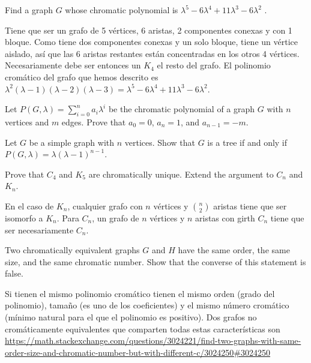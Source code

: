 \documentclass[twoside]{article}
\begin{document}
\begin{ejercicio}{3.8}
Find a graph $G$ whose chromatic polynomial is $λ^5 − 6λ^4 + 11λ^3 − 6λ^2$
.
\end{ejercicio}
\begin{solucion}
Tiene que ser un grafo de 5 vértices, 6 aristas, 2 componentes conexas y con 1 bloque. Como tiene dos componentes conexas y un solo bloque, tiene un vértice aislado, así que las 6 aristas restantes están concentradas en los otros 4 vértices. Necesariamente debe ser entonces un $K_4$ el resto del grafo. El polinomio cromático del grafo que hemos descrito es $\lambda^2(\lambda-1)(\lambda-2)(\lambda-3)=λ^5 − 6λ^4 + 11λ^3 − 6λ^2$.



\end{solucion}
\newpage

\begin{ejercicio}{3.9}
Let $P(G, λ) = \sum^n_{i=0} a_iλ^i$ be the chromatic polynomial of a graph $G$ with $n$ vertices and
$m$ edges. Prove that $a_0 = 0$, $a_n = 1$, and $a_{n−1} = −m$.
\end{ejercicio}
\begin{solucion}

\end{solucion}

\newpage

\begin{ejercicio}{3.10}
Let $G$ be a simple graph with $n$ vertices. Show that $G$ is a tree if and only if $P(G, λ) =
λ(λ − 1)^{n−1}$.

\end{ejercicio}
\begin{solucion}
\end{solucion}

\newpage

\begin{ejercicio}{3.11}
 Prove that $C_4$ and $K_5$ are chromatically unique. Extend the argument to $C_n$ and $K_n$.
\end{ejercicio}
\begin{solucion}
En el caso de $K_n$, cualquier grafo con $n$ vértices y $\binom{n}{2}$ aristas tiene que ser isomorfo a $K_n$. Para $C_n$, un grafo de $n$ vértices y $n$ aristas con girth $C_n$ tiene que ser necesariamente $C_n$. 
\end{solucion}

\newpage

\begin{ejercicio}{3.12}
Two chromatically equivalent graphs $G$ and $H$ have the same order, the same size, and
the same chromatic number. Show that the converse of this statement is false.
\end{ejercicio}
\begin{solucion}
Si tienen el mismo polinomio cromático tienen el mismo orden (grado del polinomio), tamaño (es uno de los coeficientes) y el mismo número cromático (mínimo natural para el que el polinomio es positivo). Dos grafos no cromáticamente equivalentes que comparten todas estas características son \url{https://math.stackexchange.com/questions/3024221/find-two-graphs-with-same-order-size-and-chromatic-number-but-with-different-c/3024250#3024250}
\end{solucion}
\end{document}
